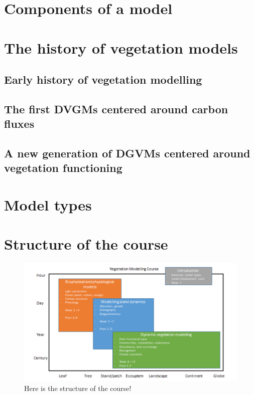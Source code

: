 \documentclass[oneside]{book}
\begin{document}
\section{Components of a model}\label{components-of-a-model}

\section{The history of vegetation
models}\label{the-history-of-vegetation-models}

\subsection{Early history of vegetation
modelling}\label{early-history-of-vegetation-modelling}

\subsection{The first DVGMs centered around carbon
fluxes}\label{the-first-dvgms-centered-around-carbon-fluxes}

\subsection{A new generation of DGVMs centered around vegetation
functioning}\label{a-new-generation-of-dgvms-centered-around-vegetation-functioning}

\section{Model types}\label{model-types}

\section{Structure of the course}\label{structure-of-the-course}

\begin{figure}

{\centering \includegraphics[width=0.8\linewidth]{figures/Figure_course} 

}

\caption{Here is the structure of the course!}\label{fig:nice-fig2}
\end{figure}
\end{document}
